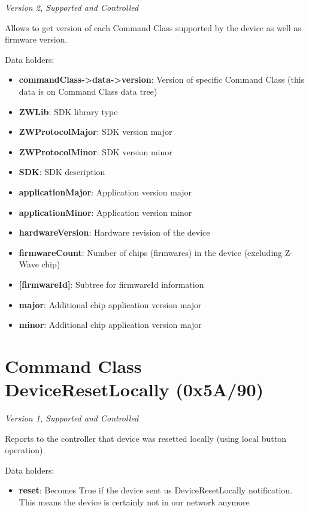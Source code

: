 \textit{Version 2, Supported and Controlled}
\newline

Allows to get version of each Command Class supported by the device as well as firmware version.
\newline

\noindent
Data holders:

\begin{itemize}
\item \textbf{commandClass->data->version}: Version of specific Command Class (this data is on Command Class data tree)
\item \textbf{ZWLib}: SDK library type
\item \textbf{ZWProtocolMajor}: SDK version major
\item \textbf{ZWProtocolMinor}: SDK version minor
\item \textbf{SDK}: SDK description
\item \textbf{applicationMajor}: Application version major
\item \textbf{applicationMinor}: Application version minor
\item \textbf{hardwareVersion}: Hardware revision of the device
\item \textbf{firmwareCount}: Number of chips (firmwares) in the device (excluding Z-Wave chip)
\item \textbf{[firmwareId]}: Subtree for firmwareId information
\item \qquad\textbf{major}: Additional chip application version major
\item \qquad\textbf{minor}: Additional chip application version major
\end{itemize}


\section{Command Class DeviceResetLocally (0x5A/90)}

\textit{Version 1, Supported and Controlled}
\newline

Reports to the controller that device was resetted locally (using local button operation).
\newline

\noindent
Data holders:

\begin{itemize}
\item \textbf{reset}: Becomes True if the device sent us DeviceResetLocally notification. This means the device is certainly not in our network anymore
\end{itemize}


